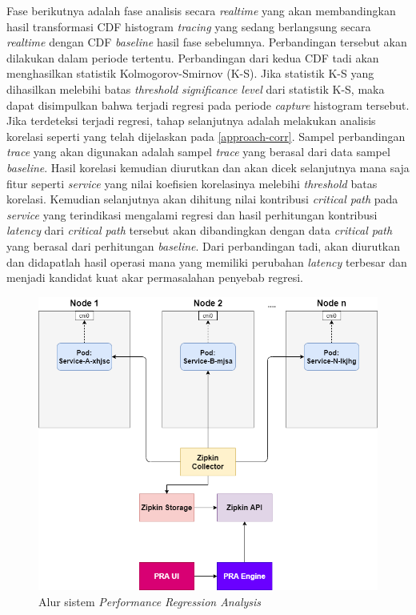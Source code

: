 Fase berikutnya adalah fase analisis secara \textit{realtime} yang akan membandingkan hasil transformasi CDF histogram \textit{tracing} yang sedang berlangsung secara \textit{realtime} dengan CDF \textit{baseline} hasil fase sebelumnya. Perbandingan tersebut akan dilakukan dalam periode tertentu. Perbandingan dari kedua CDF tadi akan menghasilkan statistik Kolmogorov-Smirnov (K-S). Jika statistik K-S yang dihasilkan melebihi batas \textit{threshold} \textit{significance level} dari statistik K-S, maka dapat disimpulkan bahwa terjadi regresi pada periode \textit{capture} histogram tersebut. Jika terdeteksi terjadi regresi, tahap selanjutnya adalah melakukan analisis korelasi seperti yang telah dijelaskan pada \ref{approach-corr}. Sampel perbandingan \textit{trace} yang akan digunakan adalah sampel \textit{trace} yang berasal dari data sampel \textit{baseline}. Hasil korelasi kemudian diurutkan dan akan dicek selanjutnya mana saja fitur seperti \textit{service} yang nilai koefisien korelasinya melebihi \textit{threshold} batas korelasi. Kemudian selanjutnya akan dihitung nilai kontribusi \textit{critical path} pada \textit{service} yang terindikasi mengalami regresi dan hasil perhitungan kontribusi \textit{latency} dari \textit{critical path} tersebut akan dibandingkan dengan data \textit{critical path} yang berasal dari perhitungan \textit{baseline}. Dari perbandingan tadi, akan diurutkan dan didapatlah hasil operasi mana yang memiliki perubahan \textit{latency} terbesar dan menjadi kandidat kuat akar permasalahan penyebab regresi.
\begin{figure}[htb]
	\centering
	\includegraphics[width=1\textwidth]{resources/ch3/alur.png}
	\caption{Alur sistem \textit{Performance Regression Analysis}}
	\label{alur-pra}
\end{figure}
\vfill


